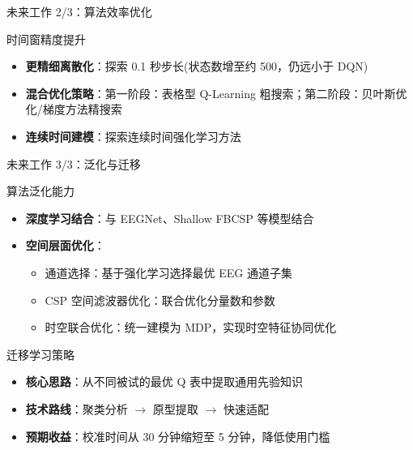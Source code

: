 {\begin{frame}{未来工作 2/3：算法效率优化}
    \begin{block}{时间窗精度提升}
        \begin{itemize}
            \item \textbf{更精细离散化}：探索 0.1 秒步长(状态数增至约 500，仍远小于 DQN)
            \item \textbf{混合优化策略}：第一阶段：表格型 Q-Learning 粗搜索；第二阶段：贝叶斯优化/梯度方法精搜索
            \item \textbf{连续时间建模}：探索连续时间强化学习方法
        \end{itemize}
    \end{block}
\end{frame}

\begin{frame}{未来工作 3/3：泛化与迁移}
    \begin{block}{算法泛化能力}
        \begin{itemize}
            \item \textbf{深度学习结合}：与 EEGNet、Shallow FBCSP 等模型结合
            \item \textbf{空间层面优化}：
            \begin{itemize}
                \item 通道选择：基于强化学习选择最优 EEG 通道子集
                \item CSP 空间滤波器优化：联合优化分量数和参数
                \item 时空联合优化：统一建模为 MDP，实现时空特征协同优化
            \end{itemize}
        \end{itemize}
    \end{block}

    \vspace{0.3cm}
    \begin{block}{迁移学习策略}
        \begin{itemize}
            \item \textbf{核心思路}：从不同被试的最优 Q 表中提取通用先验知识
            \item \textbf{技术路线}：聚类分析 $\rightarrow$ 原型提取 $\rightarrow$ 快速适配
            \item \textbf{预期收益}：校准时间从 30 分钟缩短至 5 分钟，降低使用门槛
        \end{itemize}
    \end{block}
\end{frame}

}
